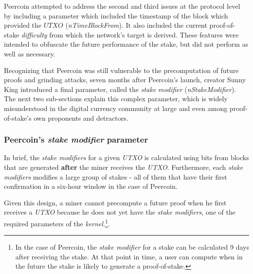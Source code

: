 \documentclass[a4paper,11pt]{article}
\begin{document}
Peercoin attempted to address the second and third issues at the protocol level by including a parameter which included the timestamp of the block which provided the $\textit{UTXO}$ (\textit{nTimeBlockFrom}). It also included the current proof-of-stake \textit{difficulty} from which the network's target is derived. These features were intended to obfuscate the future performance of the stake, but did not perform as well as necessary.

Recognizing that Peercoin was still vulnerable to the precomputation of future proofs and grinding attacks, seven months after Peercoin's launch, creator Sunny King introduced a final parameter, called the \textit{stake modifier} (\textit{nStakeModifier}). The next two sub-sections explain this complex parameter, which is widely misunderstood in the digital currency community at large and even among proof-of-stake's own proponents and detractors.  

\subsubsection*{Peercoin's \textit{stake modifier} parameter}

In brief, the \textit{stake modifiers} for a given \textit{UTXO} is calculated using bits from blocks that are generated \textbf{after} the miner receives the \textit{UTXO}. Furthermore, each \textit{stake modifiers} modifies a large group of stakes - all of them that have their first confirmation in a six-hour window in the case of Peercoin. 

Given this design, a miner cannot precompute a future proof when he first receives a \textit{UTXO} because he does not yet have the \textit{stake modifiers}, one of the required parameters of the \textit{\textit{kernel}}.\footnote{In the case of Peercoin, the \textit{stake modifier} for a stake can be calculated 9 days after receiving the stake. At that point in time, a user can compute when in the future the stake is likely to generate a proof-of-stake.}.
\end{document}
